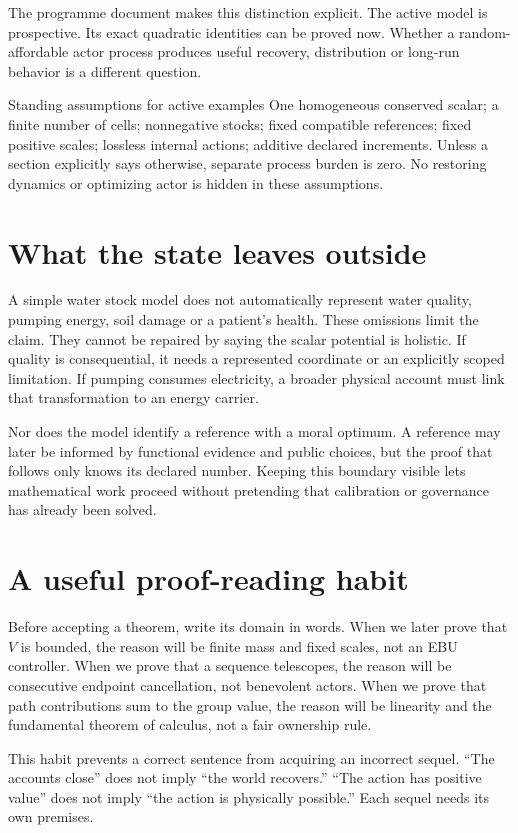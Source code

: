 The programme document \cite{programme} makes this distinction explicit.
The active model is prospective. Its exact quadratic identities can be
proved now. Whether a random-affordable actor process produces useful
recovery, distribution or long-run behavior is a different question.

\begin{lawbox}{Standing assumptions for active examples}
One homogeneous conserved scalar; a finite number of cells; nonnegative
stocks; fixed compatible references; fixed positive scales; lossless internal
actions; additive declared increments. Unless a section explicitly says
otherwise, separate process burden is zero. No restoring dynamics or
optimizing actor is hidden in these assumptions.
\end{lawbox}

\section{What the state leaves outside}
A simple water stock model does not automatically represent water quality,
pumping energy, soil damage or a patient's health. These omissions limit the
claim. They cannot be repaired by saying the scalar potential is holistic.
If quality is consequential, it needs a represented coordinate or an
explicitly scoped limitation. If pumping consumes electricity, a broader
physical account must link that transformation to an energy carrier.

Nor does the model identify a reference with a moral optimum. A reference
may later be informed by functional evidence and public choices, but the
proof that follows only knows its declared number. Keeping this boundary
visible lets mathematical work proceed without pretending that calibration
or governance has already been solved.

\section{A useful proof-reading habit}
Before accepting a theorem, write its domain in words. When we later prove
that $V$ is bounded, the reason will be finite mass and fixed scales, not an
EBU controller. When we prove that a sequence telescopes, the reason will be
consecutive endpoint cancellation, not benevolent actors. When we prove that
path contributions sum to the group value, the reason will be linearity and
the fundamental theorem of calculus, not a fair ownership rule.

This habit prevents a correct sentence from acquiring an incorrect sequel.
``The accounts close'' does not imply ``the world recovers.'' ``The action
has positive value'' does not imply ``the action is physically possible.''
Each sequel needs its own premises.

